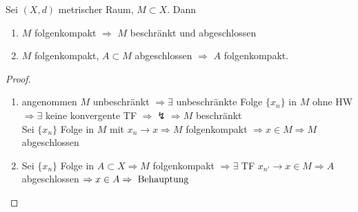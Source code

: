 \begin{proposition}
	Sei $(X,d)$ metrischer Raum, $M\subset X$. Dann
	\begin{enumerate}[label={\arabic*)}]
		\item $M$ folgenkompakt $\Rightarrow$ $M$ beschränkt und abgeschlossen
		\item $M$ folgenkompakt, $A\subset M$ abgeschlossen $\Rightarrow$ $A$ folgenkompakt.
	\end{enumerate}
\end{proposition}
\begin{proof}
	\begin{enumerate}
		\item angenommen $M$ unbeschränkt $\Rightarrow\exists$ unbeschränkte Folge $\{x_n\}$ in $M$ ohne HW $\Rightarrow\exists$ keine konvergente TF $\Rightarrow\lightning\Rightarrow M$ beschränkt \\
		Sei $\{x_n\}$ Folge in $M$ mit $x_n\to x\Rightarrow M$ folgenkompakt $\Rightarrow x\in M\Rightarrow M$ abgeschlossen
		\item Sei $\{x_n\}$ Folge in $A\subset X\Rightarrow M$ folgenkompakt $\Rightarrow\exists$ TF $x_{n'}\to x\in M\Rightarrow A$ abgeschlossen $\Rightarrow x\in A\Rightarrow \text{ Behauptung}$
	\end{enumerate}
\end{proof}

